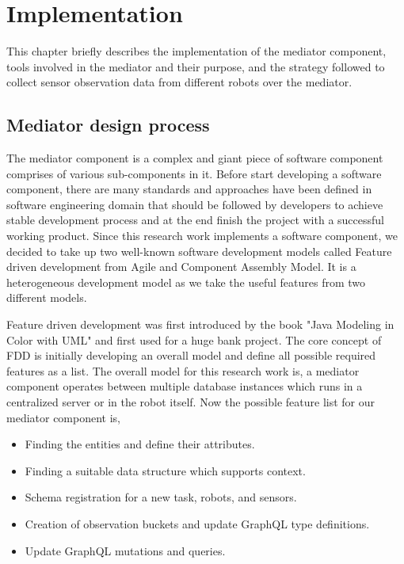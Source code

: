 

	\let\cleardoublepage\clearpage
\chapter{Implementation} \label{sec:implementation}
This chapter briefly describes the implementation of the mediator component, tools involved in the mediator and their purpose, and the strategy followed to collect sensor observation data from different robots over the mediator. 

	\section{Mediator design process}
	The mediator component is a complex and giant piece of software component comprises of various sub-components in it. Before start developing a software component, there are many standards and approaches have been defined in software engineering domain that should be followed by developers to achieve stable development process and at the end finish the project with a successful working product. Since this research work implements a software component, we decided to take up two well-known software development models called Feature driven development from Agile and Component Assembly Model. It is a heterogeneous development model as we take the useful features from two different models.
	
	Feature driven development was first introduced by the book "Java Modeling in Color with UML" \cite{misc15} and first used for a huge bank project. The core concept of FDD is initially developing an overall model and define all possible required features as a list. The overall model for this research work is, a mediator component operates between multiple database instances which runs in a centralized server or in the robot itself. Now the possible feature list for our mediator component is, 
	
	\begin{itemize}
		\item Finding the entities and define their attributes.
		\item Finding a suitable data structure which supports context.
		\item Schema registration for a new task, robots, and sensors.
		\item Creation of observation buckets and update GraphQL type definitions.
		\item Update GraphQL mutations and queries.
	\end{itemize}
	

